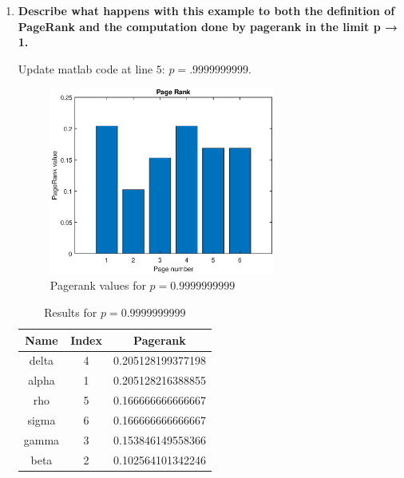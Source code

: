 \documentclass[unicode,11pt,a4paper,oneside,numbers=endperiod,openany]{scrartcl}
\begin{document}
\begin{enumerate}
    \item \textbf{Describe what happens with this example to both the definition of PageRank and the computation done by pagerank in the limit p → 1.}

          Update matlab code at line $5$:  $p = .9999999999$.


          \begin{figure}[H]
              \centering
              \includegraphics[width=0.7\textwidth]{figures/ex3p3_pagerank.eps}
              \caption{Pagerank values for $p = 0.9999999999$}
              \label{fig:ex3_pagerank_p2_histogram}
          \end{figure}

          \begin{table}[H]
              \centering
              \begin{tabular}{||c c c||}
                  \hline
                  Name  & Index & Pagerank          \\ [0.5ex]
                  \hline\hline
                  delta & 4     & 0.205128199377198 \\
                  alpha & 1     & 0.205128216388855 \\
                  rho   & 5     & 0.166666666666667 \\
                  sigma & 6     & 0.166666666666667 \\
                  gamma & 3     & 0.153846149558366 \\
                  beta  & 2     & 0.102564101342246 \\ [1ex]
                  \hline
              \end{tabular}
              \caption{Results for $p = 0.9999999999$}
              \label{table:ex3_pagerank_table_p2}
          \end{table}


\end{enumerate}
\end{document}
